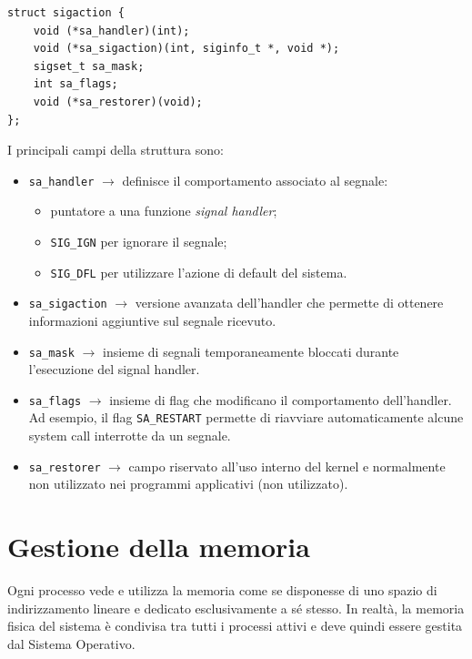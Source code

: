 \begin{verbatim}
struct sigaction {
    void (*sa_handler)(int);
    void (*sa_sigaction)(int, siginfo_t *, void *);
    sigset_t sa_mask;
    int sa_flags;
    void (*sa_restorer)(void);
};
\end{verbatim}

\noindent
I principali campi della struttura sono:

\begin{itemize}
    \item \texttt{sa\_handler} $\rightarrow$ definisce il comportamento associato al segnale:
    \begin{itemize}
        \item puntatore a una funzione \textit{signal handler};
        \item \texttt{SIG\_IGN} per ignorare il segnale;
        \item \texttt{SIG\_DFL} per utilizzare l'azione di default del sistema.
    \end{itemize}

    \item \texttt{sa\_sigaction} $\rightarrow$ versione avanzata dell'handler che permette di ottenere informazioni aggiuntive sul segnale ricevuto.

    \item \texttt{sa\_mask} $\rightarrow$ insieme di segnali temporaneamente bloccati durante l'esecuzione del signal handler.

    \item \texttt{sa\_flags} $\rightarrow$ insieme di flag che modificano il comportamento dell'handler.  
    Ad esempio, il flag \texttt{SA\_RESTART} permette di riavviare automaticamente alcune system call interrotte da un segnale.

    \item \texttt{sa\_restorer} $\rightarrow$ campo riservato all'uso interno del kernel e normalmente non utilizzato nei programmi applicativi (non utilizzato).
\end{itemize}
\newpage
\section{Gestione della memoria}
Ogni processo vede e utilizza la memoria come se disponesse di uno spazio di indirizzamento lineare e dedicato esclusivamente a sé stesso.  
In realtà, la memoria fisica del sistema è condivisa tra tutti i processi attivi e deve quindi essere gestita dal Sistema Operativo.

